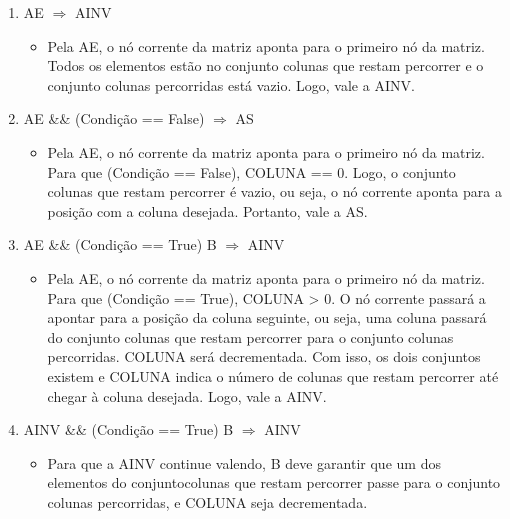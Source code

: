 \documentclass[a4paper,12pt,oneside]{book}
\begin{document}
\begin{enumerate}[label=\protect\circled{\arabic*}]
    \item AE $\Longrightarrow$ AINV

          \begin{itemize}
              \item Pela AE, o nó corrente da matriz aponta para o primeiro nó da matriz. Todos os elementos estão no conjunto colunas que restam percorrer e o conjunto colunas percorridas está vazio. Logo, vale a AINV.
          \end{itemize}

    \item AE \&\& (Condição == False) $\Longrightarrow$ AS

          \begin{itemize}
              \item Pela AE, o nó corrente da matriz aponta para o primeiro nó da matriz. Para que (Condição == False), COLUNA == 0. Logo, o conjunto colunas que restam percorrer é vazio, ou seja, o nó corrente aponta para a posição com a coluna desejada. Portanto, vale a AS.
          \end{itemize}

    \item AE \&\& (Condição == True) \circled{+} B $\Longrightarrow$ AINV

          \begin{itemize}
              \item Pela AE, o nó corrente da matriz aponta para o primeiro nó da matriz. Para que  (Condição == True), COLUNA > 0. O nó corrente passará a apontar para a posição da coluna seguinte, ou seja, uma coluna passará do conjunto colunas que restam percorrer para o conjunto colunas percorridas. COLUNA será decrementada. Com isso, os dois conjuntos existem e COLUNA indica o número de colunas que restam percorrer até chegar à coluna desejada. Logo, vale a AINV.
          \end{itemize}

    \item AINV \&\& (Condição == True) \circled{+} B $\Longrightarrow$ AINV

          \begin{itemize}
              \item Para que a AINV continue valendo, B deve garantir que um dos elementos do conjuntocolunas que restam percorrer passe para o conjunto colunas percorridas, e COLUNA seja decrementada.
          \end{itemize}


\end{enumerate}
\end{document}
